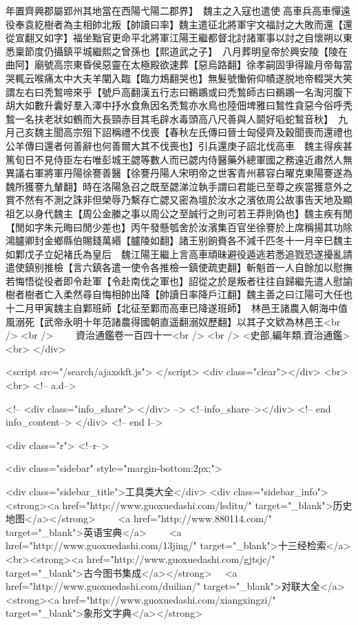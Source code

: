 年置齊興郡屬郢州其地當在西陽弋陽二郡界】　魏主之入寇也遣使高車兵高車憚遠役奉袁紇樹者為主相帥北叛【帥讀曰率】魏主遣征北將軍宇文福討之大敗而還【還從宣翻又如字】福坐黜官更命平北將軍江陽王繼都督北討諸軍事以討之自懷朔以東悉稟節度仍攝鎮平城繼熙之曾孫也【熙道武之子】　八月葬明皇帝於興安陵【陵在曲阿】廟號高宗東昏侯惡靈在太極殿欲速葬【惡烏路翻】徐孝嗣固爭得踰月帝每當哭輒云喉痛太中大夫羊闡入臨【臨力鴆翻哭也】無髮號慟俯仰幘遂脱地帝輟哭大笑謂左右曰秃鶖啼來乎【號戶高翻漢五行志曰鵜鶘或曰禿鶖師古曰鵜鶘一名淘河腹下胡大如數升囊好羣入澤中抒水食魚因名秃鶖亦水鳥也陸佃埤雅曰鶖性貪惡今俗呼秃鶖一名扶老狀如鶴而大長頸赤目其毛辟水毒頭高八尺善與人鬬好㗖蛇鶖音秋】　九月己亥魏主聞高宗殂下詔稱禮不伐喪【春秋左氏傳曰晉士匈侵齊及穀聞喪而還禮也公羊傳曰還者何善辭也何善爾大其不伐喪也】引兵還庚子詔北伐高車　魏主得疾甚篤旬日不見侍臣左右唯彭城王勰等數人而已勰内侍醫藥外總軍國之務遠近肅然人無異議右軍將軍丹陽徐謇善醫【徐謇丹陽人宋明帝之世客青州慕容白曜克東陽謇遂為魏所獲謇九輦翻】時在洛陽急召之既至勰涕泣執手謂曰君能已至尊之疾當獲意外之賞不然有不測之誅非但榮辱乃繫存亡勰又密為壇於汝水之濱依周公故事告天地及顯祖乞以身代魏主【周公金縢之事以周公之至誠行之則可若王莽則偽也】魏主疾有閒【閒如字朱元晦曰閒少差也】丙午發懸瓠舍於汝濱集百官坐徐謇於上席稱揚其功除鴻臚卿封金鄉縣伯賜錢萬緡【臚陵如翻】諸王别餉賚各不減千匹冬十一月辛巳魏主如鄴戊子立妃褚氏為皇后　魏江陽王繼上言高車頑昧避役遁逃若悉追戮恐遂擾亂請遣使鎮别推檢【言六鎮各遣一使令各推檢一鎮使疏吏翻】斬魁首一人自餘加以慰撫若悔悟從役者即令赴軍【令赴南伐之軍也】詔從之於是叛者往往自歸繼先遣人慰諭樹者樹者亡入柔然尋自悔相帥出降【帥讀日率降戶江翻】魏主善之曰江陽可大任也十二月甲寅魏主自鄴班師【北征至鄴而高車已降遂班師】　林邑王諸農入朝海中值風溺死【武帝永明十年范諸農得國朝直遥翻溺奴歷翻】以其子文欵為林邑王<br />
<br />
　　資治通鑑卷一百四十一<br />
<br />
<史部,編年類,資治通鑑>  <br>
   </div> 

<script src="/search/ajaxskft.js"> </script>
 <div class="clear"></div>
<br>
<br>
 <!-- a.d-->

 <!--
<div class="info_share">
</div> 
-->
 <!--info_share--></div>   <!-- end info_content-->
  </div> <!-- end l-->

<div class="r">   <!--r-->



<div class="sidebar"  style="margin-bottom:2px;">

 
<div class="sidebar_title">工具类大全</div>
<div class="sidebar_info">
<strong><a href="http://www.guoxuedashi.com/lsditu/" target="_blank">历史地图</a></strong>　　
<a href="http://www.880114.com/" target="_blank">英语宝典</a>　　
<a href="http://www.guoxuedashi.com/13jing/" target="_blank">十三经检索</a>　
<br><strong><a href="http://www.guoxuedashi.com/gjtsjc/" target="_blank">古今图书集成</a></strong>　
<a href="http://www.guoxuedashi.com/duilian/" target="_blank">对联大全</a>　<strong><a href="http://www.guoxuedashi.com/xiangxingzi/" target="_blank">象形文字典</a></strong>　

